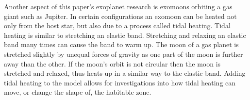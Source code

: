 \documentclass[12pt, onecolumn]{revtex4-2}    %
\begin{document}
Another aspect of this paper's exoplanet research is exomoons orbiting a gas giant such as Jupiter.
In certain configurations an exomoon can be heated not only from the host star, but also due to a process called tidal heating.
Tidal heating is similar to stretching an elastic band.
Stretching and relaxing an elastic band many times can cause the band to warm up.
The moon of a gas planet is stretched slightly by unequal forces of gravity as one part of the moon is further away than the other.
If the moon's orbit is not circular then the moon is stretched and relaxed, thus heats up in a similar way to the elastic band.
Adding tidal heating to the model allows for investigations into how tidal heating can move, or change the shape of, the habitable zone.
\end{document}
